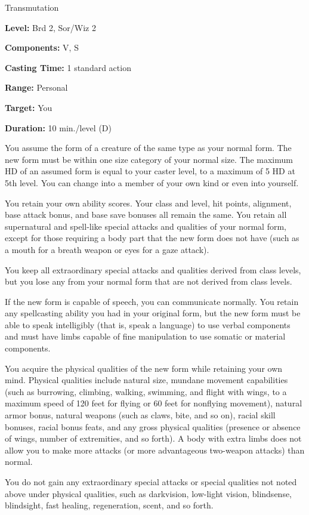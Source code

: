 
Transmutation

\textbf{Level:} Brd 2, Sor/Wiz 2

\textbf{Components:} V, S

\textbf{Casting Time:} 1 standard action

\textbf{Range:} Personal

\textbf{Target:} You

\textbf{Duration:} 10 min./level (D)

You assume the form of a creature of the same type as your normal form. The new 
form must be within one size category of your normal size. The maximum HD of an 
assumed form is equal to your caster level, to a maximum of 5 HD at 5th level. 
You can change into a member of your own kind or even into yourself.

You retain your own ability scores. Your class and level, hit points, alignment, 
base attack bonus, and base save bonuses all remain the same. You retain all supernatural 
and spell-like special attacks and qualities of your normal form, except for those 
requiring a body part that the new form does not have (such as a mouth for a breath 
weapon or eyes for a gaze attack).

You keep all extraordinary special attacks and qualities derived from class levels, 
but you lose any from your normal form that are not derived from class levels.

If the new form is capable of speech, you can communicate normally. You retain 
any spellcasting ability you had in your original form, but the new form must be 
able to speak intelligibly (that is, speak a language) to use verbal components 
and must have limbs capable of fine manipulation to use somatic or material components.

You acquire the physical qualities of the new form while retaining your own mind. 
Physical qualities include natural size, mundane movement capabilities (such as 
burrowing, climbing, walking, swimming, and flight with wings, to a maximum speed 
of 120 feet for flying or 60 feet for nonflying movement), natural armor bonus, 
natural weapons (such as claws, bite, and so on), racial skill bonuses, racial 
bonus feats, and any gross physical qualities (presence or absence of wings, number 
of extremities, and so forth). A body with extra limbs does not allow you to make 
more attacks (or more advantageous two-weapon attacks) than normal.

You do not gain any extraordinary special attacks or special qualities not noted 
above under physical qualities, such as darkvision, low-light vision, blindsense, 
blindsight, fast healing, regeneration, scent, and so forth.

